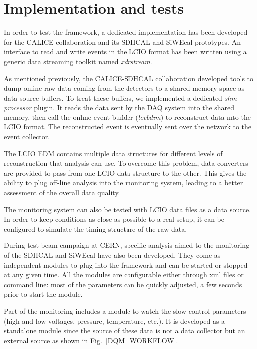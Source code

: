\documentclass[conference]{IEEEtran}
\begin{document}
\section{Implementation and tests}
In order to test the framework, a dedicated implementation has been developed for the CALICE collaboration and its SDHCAL and SiWEcal prototypes.
An interface to read and write events in the LCIO format has been written using a generic data streaming toolkit named \textit{xdrstream}.


As mentioned previously, the CALICE-SDHCAL collaboration developed tools to dump online raw data coming from the detectors to a shared memory space as data source buffers. To treat these buffers, we implemented a dedicated \textit{shm processor} plugin. It reads the data sent by the DAQ system into the shared memory, then call the online event builder (\textit{levbdim}) to reconstruct data into the LCIO format. The reconstructed event is eventually sent over the network to the event collector.

The LCIO EDM contains multiple data structures for different levels of reconstruction that analysis can use. To overcome this problem, data converters are provided to pass from one LCIO data structure to the other. This gives the ability to plug off-line analysis into the monitoring system, leading to a better assessment of the overall data quality.

The monitoring system can also be tested with LCIO data files as a data source. In order to keep conditions as close as possible to a real setup, it can be configured to simulate the timing structure of the raw data.

During test beam campaign at CERN, specific analysis aimed to the monitoring of the SDHCAL and SiWEcal have also been developed. They come as independent modules to plug into the framework and can be started or stopped at any given time. All the modules are configurable either through xml files or command line: most of the parameters can be quickly adjusted, a few seconds prior to start the module.

Part of the monitoring includes a module to watch the slow control parameters (high and low voltages, pressure, temperature, etc.). It is developed as a standalone module since the source of these data is not a data collector but an external source as shown in Fig.~\ref{DQM_WORKFLOW}.
\end{document}
